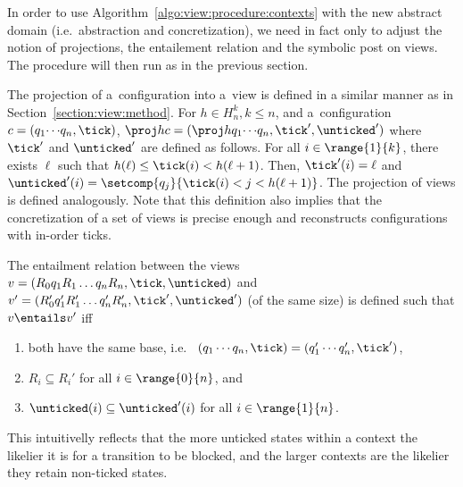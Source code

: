 In order to use Algorithm~\ref{algo:view:procedure:contexts} with the
new abstract domain (i.e.\ abstraction and concretization), we need in
fact only to adjust the notion of projections, the entailement
relation and the symbolic post on views.
%
The procedure will then run as in the previous section.

%
The projection of a~configuration into a~view is defined in a similar
manner as in
Section~\ref{section:view:method}. %
%
For $h\in H_n^k, k\leq n$, and a~configuration
$c=(q_1{\cdots}q_n,\tick)$, $\proj h c = (\proj h
{q_1{\cdots}q_n},\tick',\unticked')$ where $\tick'$ and $\unticked'$
are defined as follows. %
For all $i\in \range{1}{k}$, there exists $\ell$ such that
$h(\ell)\leq \tick(i) < h(\ell+1)$. Then, $\tick'(i) = \ell$ and
$\unticked'(i) = \setcomp{q_j}{\tick(i) < j < h(\ell+1)}$.
%
%
The projection of views is defined analogously.
%
Note that this definition also implies that the concretization of a
set of views is precise enough and reconstructs configurations with
in-order ticks.

%
The entailment relation between the views $v = (R_0q_1R_1\ldots
q_nR_{n},\tick,\unticked)$ and $v' = (R_0'q_1'R_1'\ldots
q_n'R_{n}',\tick',\unticked')$ (of the same size) is defined such that
$v\entails v'$ iff
\begin{enumerate}[label={(\roman{*})}]
\item both have the same base, i.e.\ %
  $(q_1\cdots q_n,\tick) = (q_1'\cdots q_n',\tick')$,
\item $R_i\subseteq R_i'$ for all $i\in\range{0}{n}$, and
\item $\unticked(i)\subseteq \unticked'(i)$ for all $i\in\range{1}{n}$.
\end{enumerate}
%
This intuitivelly reflects that the more unticked states within a
context the likelier it is for a transition to be blocked, and the
larger contexts are the likelier they retain non-ticked
states. %
%

